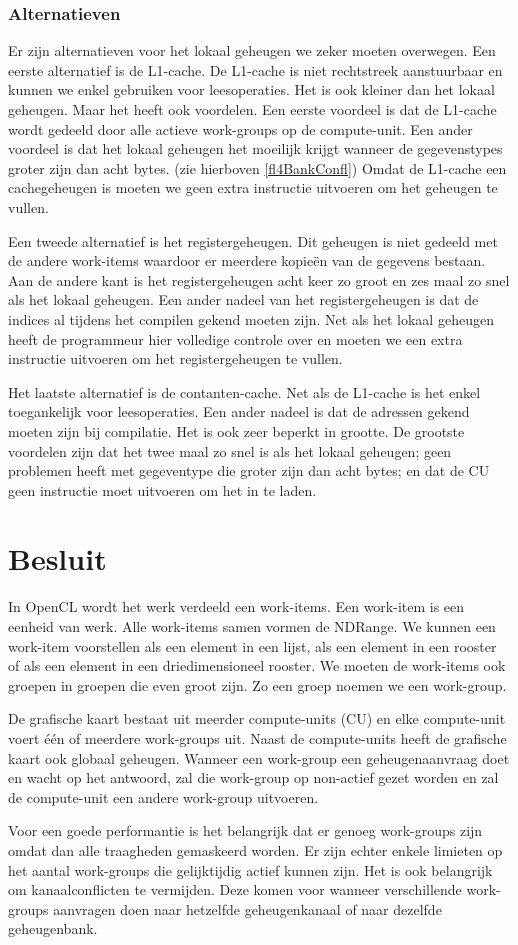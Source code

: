 \subsubsection{Alternatieven}
Er zijn alternatieven voor het lokaal geheugen we zeker moeten overwegen. Een eerste alternatief is de L1-cache. De L1-cache is niet rechtstreek aanstuurbaar en kunnen we enkel gebruiken voor leesoperaties. Het is ook kleiner dan het lokaal geheugen. Maar het heeft ook voordelen. Een eerste voordeel is dat de L1-cache wordt gedeeld door alle actieve work-groups op de compute-unit. Een ander voordeel is dat het lokaal geheugen het moeilijk krijgt wanneer de gegevenstypes groter zijn dan acht bytes. (zie hierboven \ref{fl4BankConfl}) Omdat de L1-cache een cachegeheugen is moeten we geen extra instructie uitvoeren om het geheugen te vullen.

Een tweede alternatief is het registergeheugen. Dit geheugen is niet gedeeld met de andere work-items waardoor er meerdere kopie\"en van de gegevens bestaan. Aan de andere kant is het registergeheugen acht keer zo groot en zes maal zo snel als het lokaal geheugen. Een ander nadeel van het registergeheugen is dat de indices al tijdens het compilen gekend moeten zijn. Net als het lokaal geheugen heeft de programmeur hier volledige controle over en moeten we een extra instructie uitvoeren om het registergeheugen te vullen.

Het laatste alternatief is de contanten-cache. Net als de L1-cache is het enkel toegankelijk voor leesoperaties. Een ander nadeel is dat de adressen gekend moeten zijn bij compilatie. Het is ook zeer beperkt in grootte. De grootste voordelen zijn dat het twee maal zo snel is als het lokaal geheugen; geen problemen heeft met gegeventype die groter zijn dan acht bytes; en dat de CU geen instructie moet uitvoeren om het in te laden.

\section{Besluit}
In OpenCL wordt het werk verdeeld een work-items. Een work-item is een eenheid van werk. Alle work-items samen vormen de NDRange. We kunnen een work-item voorstellen als een element in een lijst, als een element in een rooster of als een element in een driedimensioneel rooster. We moeten de work-items ook groepen in groepen die even groot zijn. Zo een groep noemen we een work-group.

De grafische kaart bestaat uit meerder compute-units (CU) en elke compute-unit voert \'e\'en of meerdere work-groups uit. Naast de compute-units heeft de grafische kaart ook globaal geheugen. Wanneer een work-group een geheugenaanvraag doet en wacht op het antwoord, zal die work-group op non-actief gezet worden en zal de compute-unit een andere work-group uitvoeren.

Voor een goede performantie is het belangrijk dat er genoeg work-groups zijn omdat dan alle traagheden gemaskeerd worden. Er zijn echter enkele limieten op het aantal work-groups die gelijktijdig actief kunnen zijn. Het is ook belangrijk om kanaalconflicten te vermijden. Deze komen voor wanneer verschillende work-groups aanvragen doen naar hetzelfde geheugenkanaal of naar dezelfde geheugenbank.